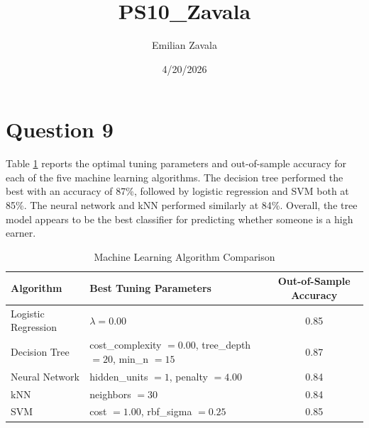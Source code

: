 \documentclass{article}
\title{PS10_Zavala}
\author{Emilian Zavala}
\date{4/20/2026}
\begin{document}
\maketitle

\section*{Question 9}

Table \ref{tab:ml_results} reports the optimal tuning parameters and out-of-sample accuracy for each of the five machine learning algorithms. The decision tree performed the best with an accuracy of 87\%, followed by logistic regression and SVM both at 85\%. The neural network and kNN performed similarly at 84\%. Overall, the tree model appears to be the best classifier for predicting whether someone is a high earner.

\begin{table}[h]
\centering
\caption{Machine Learning Algorithm Comparison}
\label{tab:ml_results}
\begin{tabular}{llc}
\hline
\textbf{Algorithm} & \textbf{Best Tuning Parameters} & \textbf{Out-of-Sample Accuracy} \\
\hline
Logistic Regression & $\lambda = 0.00$ & 0.85 \\
Decision Tree & cost\_complexity $= 0.00$, tree\_depth $= 20$, min\_n $= 15$ & 0.87 \\
Neural Network & hidden\_units $= 1$, penalty $= 4.00$ & 0.84 \\
kNN & neighbors $= 30$ & 0.84 \\
SVM & cost $= 1.00$, rbf\_sigma $= 0.25$ & 0.85 \\
\hline
\end{tabular}
\end{table}
\end{document}
